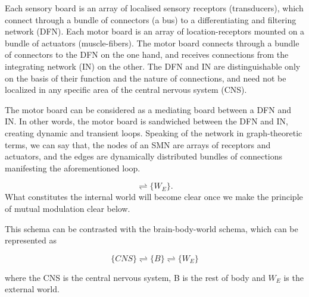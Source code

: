 Each sensory board is an array of localised sensory receptors (transducers), which connect through a bundle of connectors (a bus) to a differentiating and filtering network (DFN). Each motor board is an array of location-receptors mounted on a bundle of actuators (muscle-fibers). The motor board connects through a bundle of connectors to the DFN on the one hand, and receives connections from the integrating network (IN) on the other. The DFN and IN are distinguishable only on the basis of their function and the nature of connections, and need not be localized in any specific area of the central nervous system (CNS).

The motor board can be considered as a mediating board between a DFN and IN. In other words, the motor board is sandwiched between the DFN and IN, creating dynamic and transient loops. Speaking of the network in graph-theoretic terms, we can say that, the nodes of an SMN are arrays of receptors and actuators, and the edges are dynamically distributed bundles of connections manifesting the aforementioned loop.

\begin{equation}
[\{n(SMN)\}_i \rightleftharpoons \{n(SMN)\}_j] \rightleftharpoons \{W_E\}.
\end{equation}
What constitutes the internal world will become clear once we make the principle of mutual modulation clear below.


This schema can be contrasted with the brain-body-world schema, which can be represented as 

\begin{equation}
\{CNS\} \rightleftharpoons \{B\} \rightleftharpoons \{W_E\}
\end{equation}

where the CNS is the central nervous system, B is the rest of body and $W_E$ is the external world.

